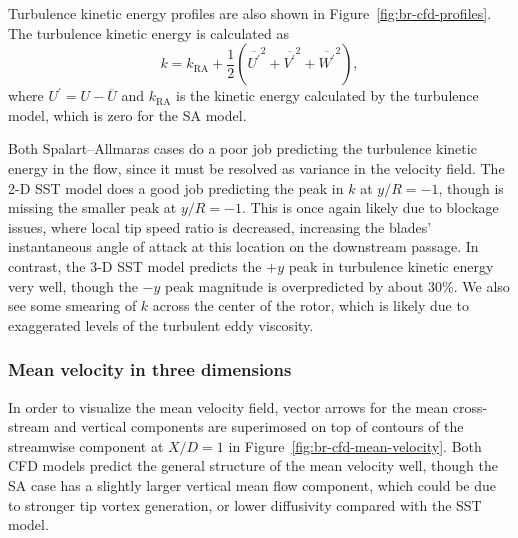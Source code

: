 Turbulence kinetic energy profiles are also shown in
Figure~\ref{fig:br-cfd-profiles}. The turbulence kinetic energy is calculated as
\begin{equation}
    k = k_{\mathrm{RA}} + \frac{1}{2} \left(
    \overline{U^\prime}^2 +
    \overline{V^\prime}^2 +
    \overline{W^\prime}^2 \right),
    \label{eq:k}
\end{equation}
where $U^\prime = U - \overline{U}$ and $k_{\mathrm{RA}}$ is the kinetic energy
calculated by the turbulence model, which is zero for the SA model.


Both Spalart--Allmaras cases do a poor job predicting the turbulence kinetic
energy in the flow, since it must be resolved as variance in the velocity field.
The 2-D SST model does a good job predicting the peak in $k$ at $y/R=-1$, though
is missing the smaller peak at $y/R=-1$. This is once again likely due to
blockage issues, where local tip speed ratio is decreased, increasing the
blades' instantaneous angle of attack at this location on the downstream
passage. In contrast, the 3-D SST model predicts the $+y$ peak in turbulence
kinetic energy very well, though the $-y$ peak magnitude is overpredicted by
about 30\%. We also see some smearing of $k$ across the center of the rotor,
which is likely due to exaggerated levels of the turbulent eddy viscosity.


\subsubsection{Mean velocity in three dimensions}

In order to visualize the mean velocity field, vector arrows for the mean
cross-stream and vertical components are superimosed on top of contours of the
streamwise component at $X/D=1$ in Figure~\ref{fig:br-cfd-mean-velocity}. Both
CFD models predict the general structure of the mean velocity well, though the
SA case has a slightly larger vertical mean flow component, which could be due
to stronger tip vortex generation, or lower diffusivity compared with the SST
model.

